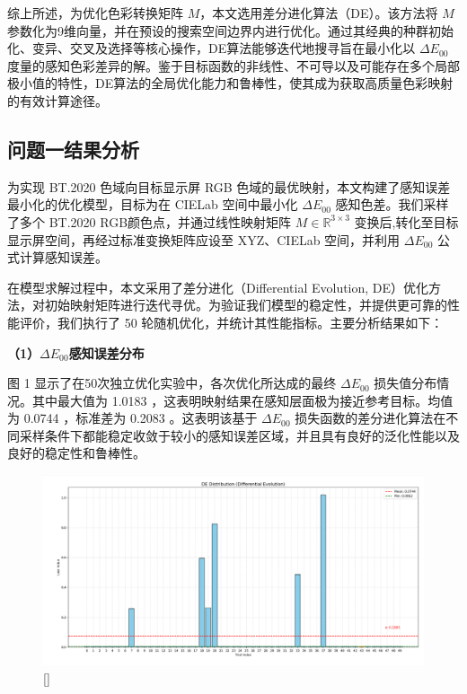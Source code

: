 综上所述，为优化色彩转换矩阵 $M$，本文选用差分进化算法（DE）。该方法将 $M$ 参数化为9维向量，并在预设的搜索空间边界内进行优化。通过其经典的种群初始化、变异、交叉及选择等核心操作，DE算法能够迭代地搜寻旨在最小化以 $\Delta E_{00}$ 度量的感知色彩差异的解。鉴于目标函数的非线性、不可导以及可能存在多个局部极小值的特性，DE算法的全局优化能力和鲁棒性，使其成为获取高质量色彩映射的有效计算途径。


\subsection[\hspace{-2pt}问题一结果分析]{{\heiti{} \hspace{-8pt}问题一结果分析}}\label{section4: 问题一结果分析}


为实现 BT.2020 色域向目标显示屏 RGB 色域的最优映射，本文构建了感知误差最小化的优化模型，目标为在 CIELab 空间中最小化 $\Delta E_{00}$ 感知色差。我们采样了多个 BT.2020 RGB颜色点，并通过线性映射矩阵 $M\in \mathbb{R}^{3\times 3}$ 变换后,转化至目标显示屏空间，再经过标准变换矩阵应设至 XYZ、CIELab 空间，并利用 $\Delta E_{00}$ 公式计算感知误差。

在模型求解过程中，本文采用了差分进化（Differential Evolution, DE）优化方法，对初始映射矩阵进行迭代寻优。为验证我们模型的稳定性，并提供更可靠的性能评价，我们执行了 50 轮随机优化，并统计其性能指标。主要分析结果如下：

\noindent\textbf{（1）$\Delta E_{00}$感知误差分布}

图 1 显示了在50次独立优化实验中，各次优化所达成的最终 $\Delta E_{00}$ 损失值分布情况。其中最大值为 1.0183 ，这表明映射结果在感知层面极为接近参考目标。均值为 0.0744 ，标准差为 0.2083 。这表明该基于 $\Delta E_{00}$ 损失函数的差分进化算法在不同采样条件下都能稳定收敛于较小的感知误差区域，并且具有良好的泛化性能以及良好的稳定性和鲁棒性。
\begin{figure}[h]
\centering
{}
\includegraphics[width=1.0\columnwidth]{figures/DE2000.png}
\bicaption[50次独立优化实验柱状损失图]{}[]{}
\vspace{-10pt}
\label{figure3: 柱状loss}
\end{figure}

